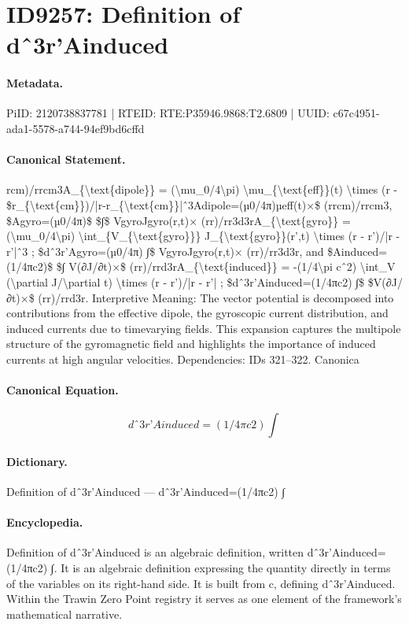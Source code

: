 \section*{ID9257: Definition of dˆ3r’Ainduced}
\paragraph{Metadata.}
PiID: 2120738837781 | RTEID: RTE:P35946.9868:T2.6809 | UUID: c67c4951-ada1-5578-a744-94ef9bd6cffd

\paragraph{Canonical Statement.}
rcm)/rrcm3A\_\{\textbackslash{}text\{dipole\}\} = (\textbackslash{}mu\_0/4\textbackslash{}pi) \textbackslash{}mu\_\{\textbackslash{}text\{eff\}\}(t) \textbackslash{}times (r - \$r\_\{\textbackslash{}text\{cm\}\})/|r-r\_\{\textbackslash{}text\{cm\}\}|ˆ3Adipole=(µ0/4π)µeff(t)×\$ (rrcm)/rrcm3, \$Agyro=(µ0/4π)\$ \$∫\$ VgyroJgyro(r,t)× (rr)/rr3d3rA\_\{\textbackslash{}text\{gyro\}\} = (\textbackslash{}mu\_0/4\textbackslash{}pi) \textbackslash{}int\_\{V\_\{\textbackslash{}text\{gyro\}\}\} J\_\{\textbackslash{}text\{gyro\}\}(r’,t) \textbackslash{}times (r - r’)/|r - r’|ˆ3 ; \$dˆ3r’Agyro=(µ0/4π) ∫\$ VgyroJgyro(r,t)× (rr)/rr3d3r, and \$Ainduced=(1/4πc2)\$ \$∫ V(∂J/∂t)×\$ (rr)/rrd3rA\_\{\textbackslash{}text\{induced\}\} = -(1/4\textbackslash{}pi cˆ2) \textbackslash{}int\_V (\textbackslash{}partial J/\textbackslash{}partial t) \textbackslash{}times (r - r’)/|r - r’| ; \$dˆ3r’Ainduced=(1/4πc2) ∫\$ \$V(∂J/∂t)×\$ (rr)/rrd3r. Interpretive Meaning: The vector potential is decomposed into contributions from the effective dipole, the gyroscopic current distribution, and induced currents due to timevarying fields. This expansion captures the multipole structure of the gyromagnetic field and highlights the importance of induced currents at high angular velocities. Dependencies: IDs 321–322. Canonica

\paragraph{Canonical Equation.}
\[
dˆ3r’Ainduced=(1/4πc2) ∫
\]

\paragraph{Dictionary.}
Definition of dˆ3r’Ainduced — dˆ3r’Ainduced=(1/4πc2) ∫

\paragraph{Encyclopedia.}
Definition of dˆ3r’Ainduced is an algebraic definition, written dˆ3r’Ainduced=(1/4πc2) ∫. It is an algebraic definition expressing the quantity directly in terms of the variables on its right-hand side. It is built from c, defining dˆ3r’Ainduced. Within the Trawin Zero Point registry it serves as one element of the framework's mathematical narrative.
